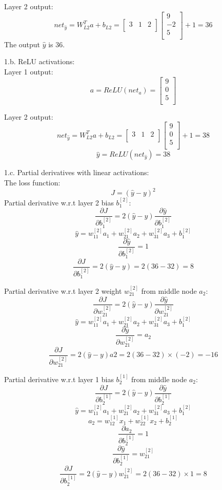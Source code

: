 \documentclass[10pt]{article}
\begin{document}
Layer 2 output:
\[
	net_{\hat{y}}=W_{L2}^T a + b_{L2}=
	\left[
	{
		\begin{array}{ccc}
		3&1&2\\
		\end{array}
	}
	\right]
	\left[
	{
		\begin{array}{c}
		9\\
		-2\\
		5\\
		\end{array}
	}
	\right]+1=36
\]
The output $\hat{y}$ is 36.

1.b. ReLU activations:\\
Layer 1 output:
\[
	a=ReLU(net_{a})=
	\left[
	{
		\begin{array}{c}
		9\\
		0\\
		5\\
		\end{array}
	}
	\right]
\]

Layer 2 output:
\[
	net_{\hat{y}}=W_{L2}^T a + b_{L2}=
	\left[
	{
		\begin{array}{ccc}
		3&1&2\\
		\end{array}
	}
	\right]
	\left[
	{
		\begin{array}{c}
		9\\
		0\\
		5\\
		\end{array}
	}
	\right]+1=38
\]
\[
	\hat{y}=ReLU(net_{\hat{y}})=38
\]

1.c. Partial derivatives with linear activations:\\
The loss function:
\[J=(\hat{y}-y)^2\]
Partial derivative w.r.t layer 2 bias $b_1^{[2]}$:
\[
	\frac{\partial J}{\partial b_1^{[2]}}=
	2(\hat{y}-y)\frac{\partial \hat{y}}{\partial b_1^{[2]}}
\]
\[
	\hat{y}=w_{11}^{[2]}a_1+w_{21}^{[2]}a_2+w_{31}^{[2]}a_3+b_1^{[2]}
\]
\[
	\frac{\partial \hat{y}}{\partial b_1^{[2]}}=1
\]
\[
	\frac{\partial J}{\partial b_1^{[2]}}=
	2(\hat{y}-y)=2(36-32)=8
\]

Partial derivative w.r.t layer 2 weight $w_{21}^{[2]}$ from middle node $a_2$:
\[
	\frac{\partial J}{\partial w_{21}^{[2]}}=
	2(\hat{y}-y)\frac{\partial \hat{y}}{\partial w_{21}^{[2]}}
\]
\[
	\hat{y}=w_{11}^{[2]}a_1+w_{21}^{[2]}a_2+w_{31}^{[2]}a_3+b_1^{[2]}
\]
\[
	\frac{\partial \hat{y}}{\partial w_{21}^{[2]}}=a_2
\]
\[
	\frac{\partial J}{\partial w_{21}^{[2]}}=
	2(\hat{y}-y)a2=2(36-32)\times(-2)=-16
\]

Partial derivative w.r.t layer 1 bias $b_2^{[1]}$ from middle node $a_2$:
\[
	\frac{\partial J}{\partial b_{2}^{[1]}}=
	2(\hat{y}-y)\frac{\partial \hat{y}}{\partial b_2^{[1]}}
\]
\[
	\hat{y}=w_{11}^{[2]}a_1+w_{21}^{[2]}a_2+w_{31}^{[2]}a_3+b_1^{[2]}
\]
\[
	a_2=w_{12}^{[1]}x_1+w_{22}^{[1]}x_2+b_2^{[1]}
\]
\[
	\frac{\partial a_2}{\partial b_2^{[1]}}=1
\]
\[
	\frac{\partial \hat{y}}{\partial b_2^{[1]}}=w_{21}^{[2]}
\]
\[
	\frac{\partial J}{\partial b_2^{[1]}}=
	2(\hat{y}-y)w_{21}^{[2]}=2(36-32) \times 1=8
\]
\end{document}

